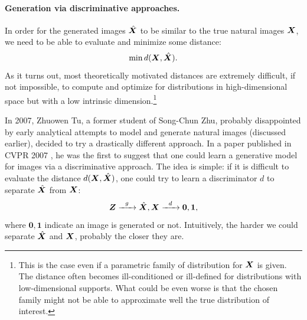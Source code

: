\documentclass[../../book-main.tex]{subfiles}
\begin{document}
\paragraph{Generation via discriminative approaches.}
In order for the generated images $\hat {\bm{X}}$ to be similar to the true natural images $\bm{X}$, we need to be able to evaluate and minimize some distance:
\begin{equation}
    \min d(\bm{X}, \hat {\bm{X}}).
\end{equation}
As it turns out, most theoretically motivated  distances are extremely difficult, if not impossible, to compute and optimize for distributions in high-dimensional space but with a low intrinsic dimension.\footnote{This is the case even if a parametric family of distribution for $\bm{X}$ is given. The distance often becomes ill-conditioned or ill-defined for distributions with low-dimensional supports. What could be even worse is that the chosen family might not be able to approximate well the true distribution of interest.} 

In 2007, Zhuowen Tu, a former student of Song-Chun Zhu, probably disappointed by early analytical attempts to model and generate natural images (discussed earlier), decided to try a drastically different approach. In a paper published in CVPR 2007 \cite{Tu-2007}, he was the first to suggest that one could learn a generative model for images via a discriminative approach. The idea is simple: if it is difficult to evaluate the distance $d(\bm{X}, \hat {\bm{X}})$, one could try to  learn a discriminator $d$ to separate $\hat {\bm{X}}$ from $\bm{X}$: 
\begin{equation}
    \bm{Z}   \xrightarrow{\hspace{2mm} g  \hspace{2mm}} \hat {\bm{X}}, \bm{X} \xrightarrow{\hspace{2mm} d  \hspace{2mm}} \boldsymbol{0}, \boldsymbol{1},
       \label{eqn:gan-networks}
\end{equation}
where $\boldsymbol{0}, \boldsymbol{1}$ indicate an image is generated or not.
Intuitively, the harder we could separate $\hat {\bm{X}}$ and   $\bm{X}$, probably the closer they are. 
\end{document}

